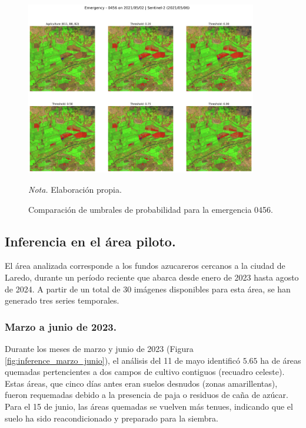 \begin{figure}[H]
    \centering
    \caption{Comparación de umbrales de probabilidad para la emergencia 0456.}
    \label{fig:comparacion_umbrales_0456}
    \includegraphics[width=0.9\textwidth]{img/7_resultados/0456.png}
    \begin{flushleft}
        \vspace{-\baselineskip}
        \textit{Nota.} Elaboración propia.
        \vspace{-\baselineskip}
    \end{flushleft}
\end{figure}

\subsection{Inferencia en el área piloto.}
El área analizada corresponde a los fundos azucareros cercanos a la ciudad de Laredo, durante un período reciente que abarca desde enero de 2023 hasta agosto de 2024. A partir de un total de 30 imágenes disponibles 
para esta área, se han generado tres series temporales.

\subsubsection{Marzo a junio de 2023.}
Durante los meses de marzo y junio de 2023 (Figura \ref{fig:inference_marzo_junio}), el análisis del 11 de mayo identificó $5.65$ ha de áreas quemadas pertencientes a dos campos de cultivo contiguos (recuadro celeste). Estas áreas, que cinco días antes eran suelos desnudos (zonas amarillentas), 
fueron requemadas debido a la presencia de paja o residuos de caña de azúcar. Para el 15 de junio, las áreas quemadas se vuelven más tenues, indicando que el suelo ha sido reacondicionado y preparado 
para la siembra.

